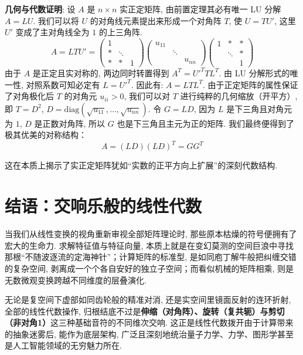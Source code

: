 \documentclass{ctexart}
\begin{document}
\textbf{几何与代数证明}:
设 $A$ 是 $n \times n$ 实正定矩阵, 由前置定理其必有唯一 LU 分解 $A = LU$. 
我们可以将 $U$ 的对角线元素提出来形成一个对角阵 $T$, 使 $U = T U'$, 这里 $U'$ 变成了主对角线全为 $1$ 的上三角阵.
$$
A = L T U' =
\begin{pmatrix} 1 & & \\ * & \ddots & \\ * & * & 1 \end{pmatrix}
\begin{pmatrix} u_{11} & & \\ & \ddots & \\ & & u_{nn} \end{pmatrix}
\begin{pmatrix} 1 & * & * \\ & \ddots & * \\ & & 1 \end{pmatrix}
$$
由于 $A$ 是正定且实对称的, 两边同时转置得到 $A^T = U'^T T L^T$. 由 LU 分解形式的唯一性, 对照系数可知必定有 $L = U'^T$.
因此有: $A = L T L^T$.
由于正定矩阵的属性保证了对角极化后 $T$ 的对角元 $u_{ii} > 0$, 我们可以对 $T$ 进行纯粹的几何缩放（开平方）, 即 $T = D^2$, $D = \text{diag}(\sqrt{u_{11}}, \ldots, \sqrt{u_{nn}})$.
令 $G = LD$, 因为 $L$ 是下三角且对角元为 $1$, $D$ 是正数对角阵, 所以 $G$ 也是下三角且主元为正的矩阵. 我们最终便得到了极其优美的对称结构：
$$A = (LD)(LD)^T = GG^T$$ 

这在本质上揭示了实正定矩阵犹如“实数的正平方向上扩展”的深刻代数结构.

\section{结语：交响乐般的线性代数}

当我们从线性变换的视角重新审视全部矩阵理论时, 那些原本枯燥的符号便拥有了宏大的生命力. 求解特征值与特征向量, 本质上就是在变幻莫测的空间巨浪中寻找那根“不随波逐流的定海神针”；计算矩阵的标准型, 是如同庖丁解牛般把纠缠交错的复杂空间, 剥离成一个个各自安好的独立子空间；而看似机械的矩阵相乘, 则是无数微观变换跨越不同维度的层叠演化.

无论是复空间下虚部如同齿轮般的精准对消, 还是实空间里镜面反射的连环折射, 全部的线性代数操作, 归根结底不过是\textbf{伸缩（对角阵）、旋转（复共轭）与剪切（非对角1）}这三种基础音符的不同维次交响. 这正是线性代数拨开由于计算带来的抽象迷雾后, 能作为底层架构, 广泛且深刻地统治量子力学、力学、图形学甚至是人工智能领域的无穷魅力所在.
\end{document}
